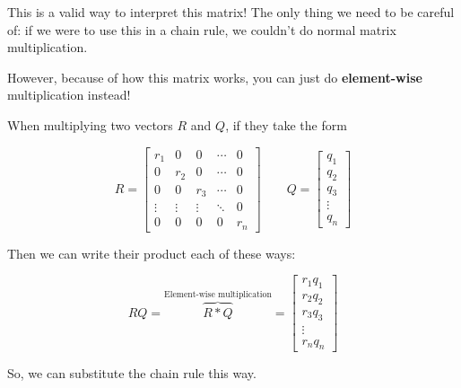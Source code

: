         This is a valid way to interpret this matrix! The only thing we need to be careful of: if we were to use this in a chain rule, we couldn't do normal matrix multiplication.
        
        However, because of how this matrix works, you can just do \textbf{element-wise} multiplication instead!
            
        \begin{concept}
            When multiplying two vectors $R$ and $Q$, if they take the form
            
            \begin{equation*}
                R = 
                \begin{bmatrix}
                    r_1     &0      &0      &\cdots & 0 \\
                    0       &r_2    &0      &\cdots & 0 \\
                    0       &0      &r_3    &\cdots & 0 \\
                    \vdots  &\vdots &\vdots &\ddots & 0 \\
                    0       &0      &0      &0      & r_n 
                \end{bmatrix}
                \qquad
                Q =
                \begin{bmatrix}
                    q_1 \\ q_2\\ q_3 \\ \vdots \\q_n
                \end{bmatrix}
            \end{equation*}
            
            Then we can write their product each of these ways:
            
            \begin{equation}
                RQ = 
                \overbrace{
                    R * Q
                }^{\text{Element-wise multiplication}}
                =
                \begin{bmatrix}
                    r_1q_1 \\ r_2q_2\\ r_3q_3 \\ \vdots \\r_nq_n
                \end{bmatrix}
            \end{equation}
        \end{concept}
        
        So, we can substitute the chain rule this way.

        